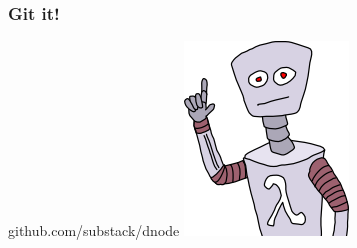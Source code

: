 \documentclass{beamer}
\begin{document}
\begin{frame}
    \frametitle{Git it!}
    \begin{center}
        \huge
        github.com/substack/dnode
        \newline
        \includegraphics[scale=0.5]{images/robot.png}
    \end{center}
\end{frame}
\end{document}
